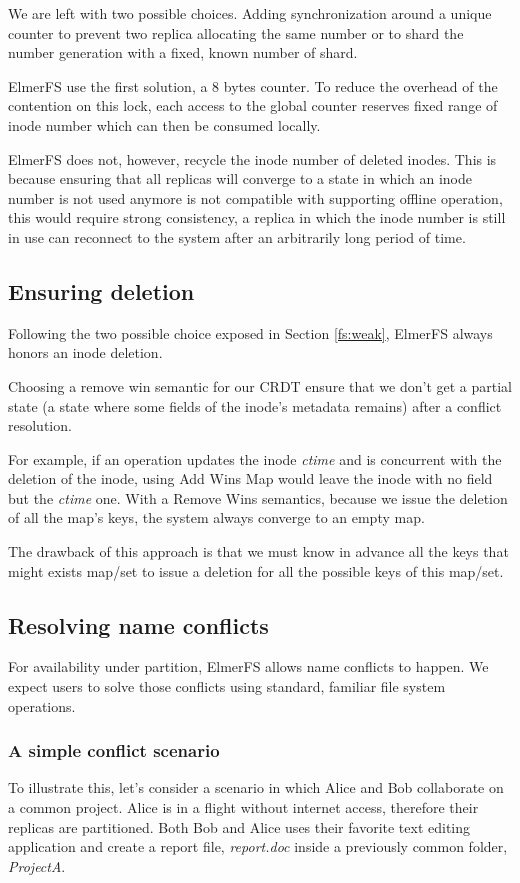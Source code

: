 \documentclass[sigconf, 10pt]{acmart}
\begin{document}
We are left with two possible choices. Adding synchronization around a unique
counter to prevent two replica allocating the same number or to shard the number generation
with a fixed, known number of shard.

ElmerFS use the first solution, a 8 bytes counter.
To reduce the overhead of the contention on this lock, each access to the global counter reserves fixed range of inode number which can then be consumed locally.

ElmerFS does not, however, recycle the inode number of deleted inodes.
This is because ensuring that all replicas will converge to a state in which
an inode number is not used anymore is not compatible with supporting offline
operation, this would require strong consistency, a replica in which the inode number
is still in use can reconnect to the system after an arbitrarily long period of time.

\subsection{Ensuring deletion}

\label{sec:deletion}
Following the two possible choice exposed in Section \ref{fs:weak}, ElmerFS always honors
an inode deletion.

Choosing a remove win semantic for our CRDT ensure that we don't get a partial
state (a state where some fields of the inode's metadata remains) after a conflict resolution.

For example, if an operation updates the inode \textit{ctime} and is concurrent with the deletion of the inode,
using Add Wins Map would leave the inode with no field but the \textit{ctime} one. With a Remove Wins semantics, because
we issue the deletion of all the map's keys, the system always converge to an empty map.

The drawback of this approach is that we must know in advance all the keys that might exists map/set to issue a deletion for all the possible keys of this map/set.

\subsection{Resolving name conflicts}

For availability under partition, ElmerFS allows name conflicts to happen. We expect users to solve
those conflicts using standard, familiar file system operations.

\subsubsection{A simple conflict scenario}
To illustrate this, let's consider a scenario in which Alice and Bob collaborate on a common project.
Alice is in a flight without internet access, therefore their replicas are
partitioned.
Both Bob and Alice uses their favorite text editing application and create a report file, \textit{report.doc} inside a previously common folder, \textit{ProjectA}.
\end{document}
